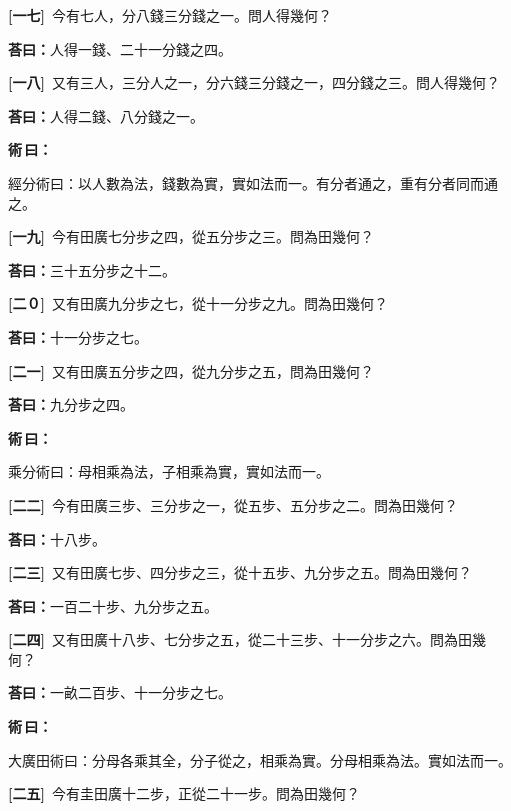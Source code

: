 \documentclass[11pt,a4paper]{article}
\newenvironment{method}{%
  \par\noindent\textcolor{methodcolor}{\textbf{術\,曰：}}%
  \ignorespaces
}{\par\vspace{0.5em}}
\newcommand{\problemnum}[1]{\textbf{[\ignorespaces#1\unskip]}}
\begin{document}
\noindent\problemnum{一七}\,
今有七人，分八錢三分錢之一。問人得幾何？

\noindent\textcolor{answercolor}{\textbf{荅曰：}}人得一錢、二十一分錢之四。

\noindent\problemnum{一八}\,
又有三人，三分人之一，分六錢三分錢之一，四分錢之三。問人得幾何？

\noindent\textcolor{answercolor}{\textbf{荅曰：}}人得二錢、八分錢之一。

\begin{method}
經分術曰：以人數為法，錢數為實，實如法而一。有分者通之，重有分者同而通之。
\end{method}

\noindent\problemnum{一九}\,
今有田廣七分步之四，從五分步之三。問為田幾何？

\noindent\textcolor{answercolor}{\textbf{荅曰：}}三十五分步之十二。

\noindent\problemnum{二０}\,
又有田廣九分步之七，從十一分步之九。問為田幾何？

\noindent\textcolor{answercolor}{\textbf{荅曰：}}十一分步之七。

\noindent\problemnum{二一}\,
又有田廣五分步之四，從九分步之五，問為田幾何？

\noindent\textcolor{answercolor}{\textbf{荅曰：}}九分步之四。

\begin{method}
乘分術曰：母相乘為法，子相乘為實，實如法而一。
\end{method}

\noindent\problemnum{二二}\,
今有田廣三步、三分步之一，從五步、五分步之二。問為田幾何？

\noindent\textcolor{answercolor}{\textbf{荅曰：}}十八步。

\noindent\problemnum{二三}\,
又有田廣七步、四分步之三，從十五步、九分步之五。問為田幾何？

\noindent\textcolor{answercolor}{\textbf{荅曰：}}一百二十步、九分步之五。

\noindent\problemnum{二四}\,
又有田廣十八步、七分步之五，從二十三步、十一分步之六。問為田幾何？

\noindent\textcolor{answercolor}{\textbf{荅曰：}}一畝二百步、十一分步之七。

\begin{method}
大廣田術曰：分母各乘其全，分子從之，相乘為實。分母相乘為法。實如法而一。
\end{method}

\noindent\problemnum{二五}\,
今有圭田廣十二步，正從二十一步。問為田幾何？
\end{document}
